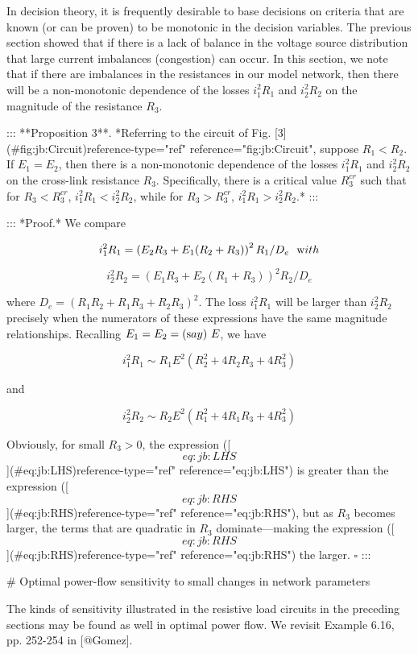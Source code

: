 In decision theory, it is frequently desirable to base decisions on criteria that are known (or can be proven) to be monotonic in the decision variables. The previous section showed that if there is a lack of balance in the voltage source distribution that large current imbalances (congestion) can occur. In this section, we note that if there are imbalances in the resistances in our model network, then there will be a non-monotonic dependence of the losses $i_1^2R_1$ and $i_2^2R_2$ on the magnitude of the resistance $R_3$.

::: **Proposition 3**. *Referring to the circuit of Fig. [3](#fig:jb:Circuit){reference-type="ref" reference="fig:jb:Circuit"}, suppose $R_1<R_2$. If $E_1=E_2$, then there is a non-monotonic dependence of the losses $i_1^2R_1$ and $i_2^2R_2$ on the cross-link resistance $R_3$. Specifically, there is a critical value $R_3^{cr}$ such that for $R_3<R_3^{cr}$, $i_1^2R_1<i_2^2R_2$, while for $R_3>R_3^{cr}$, $i_1^2R_1>i_2^2R_2$.* :::

::: *Proof.* We compare

$$i_1^2R_1 =\left(E_2R_3+E_1(R_2+R_3)\right)^2 R_1/D_e \ \ {\textrm with}$$

$$i_2^2R_2 =\left(E_1R_3+E_2(R_1+R_3)\right)^2 R_2/D_e$$

where $D_e=(R_1R_2+R_1R_3+R_2R_3)^2$. The loss $i_1^2R_1$ will be larger than $i_2^2R_2$ precisely when the numerators of these expressions have the same magnitude relationships. Recalling $E_1=E_2=({\textrm say})\ E$, we have

$$i_1^2R_1\sim R_1E^2\left(R_2^2+4 R_2R_3+4 R_3^2\right) \label{eq:jb:LHS}$$

and

$$i_2^2R_2\sim R_2E^2\left(R_1^2+4 R_1R_3+4 R_3^2\right) \label{eq:jb:RHS}$$

Obviously, for small $R_3>0$, the expression ([\[eq:jb:LHS\]](#eq:jb:LHS){reference-type="ref" reference="eq:jb:LHS"}) is greater than the expression ([\[eq:jb:RHS\]](#eq:jb:RHS){reference-type="ref" reference="eq:jb:RHS"}), but as $R_3$ becomes larger, the terms that are quadratic in $R_3$ dominate---making the expression ([\[eq:jb:RHS\]](#eq:jb:RHS){reference-type="ref" reference="eq:jb:RHS"}) the larger. $\square$ :::

# Optimal power-flow sensitivity to small changes in network parameters

The kinds of sensitivity illustrated in the resistive load circuits in the preceding sections may be found as well in optimal power flow. We revisit Example 6.16, pp. 252-254 in [@Gomez].

